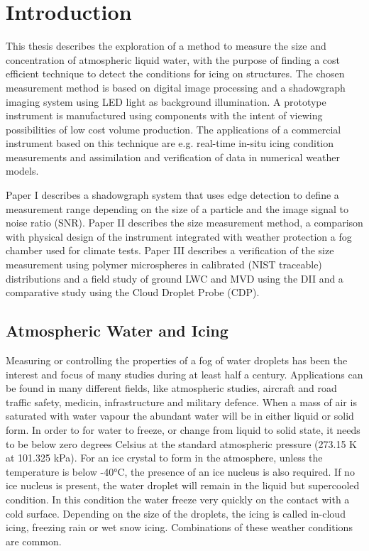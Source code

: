 

\chapter{Introduction}

This thesis describes the exploration of a method to measure the size and concentration of atmospheric liquid water, with the purpose of finding a cost efficient technique to detect the conditions for icing on structures. The chosen measurement method is based on digital image processing and a shadowgraph imaging system using LED light as background illumination. A prototype instrument is manufactured using components with the intent of viewing possibilities of low cost volume production. The applications of a commercial instrument based on this technique are e.g. real-time in-situ icing condition measurements and assimilation and verification of data in numerical weather models. 

Paper I describes a shadowgraph system that uses edge detection to define a measurement range depending on the size of a particle and the image signal to noise ratio (SNR). Paper II describes the size measurement method, a comparison with  physical design of the instrument integrated with weather protection a fog chamber used for climate tests. Paper III describes a verification of the size measurement using polymer microspheres in calibrated (NIST traceable) distributions and a field study of ground LWC and MVD using the DII and a comparative study using the Cloud Droplet Probe (CDP).

\section{Atmospheric Water and Icing}

Measuring or controlling the properties of a fog of water droplets has been the interest and focus of many studies during at least half a century. Applications can be found in many different fields, like atmospheric studies, aircraft and road traffic safety, medicin, infrastructure and military defence. When a mass of air is saturated with water vapour the abundant water will be in either liquid or solid form. In order to for water to freeze, or change from liquid to solid state, it needs to be below zero degrees Celsius at the standard atmospheric pressure (273.15 K at 101.325 kPa). For an ice crystal to form in the atmosphere, unless the temperature is below -40°C, the presence of an ice nucleus is also required. If no ice nucleus is present, the water droplet will remain in the liquid but supercooled condition. In this condition the water freeze very quickly on the contact with a cold surface. Depending on the size of the droplets, the icing is called in-cloud icing, freezing rain or wet snow icing. Combinations of these weather conditions are common.

